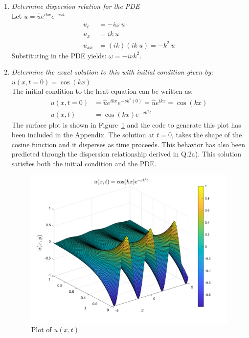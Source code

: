 \documentclass[11pt]{article}
\begin{document}
\begin{enumerate}
\begin{enumerate}[label=(\alph*)]
\item{\color{blue}\textit{Determine dispersion relation for the PDE}}\\
Let  $u  = \hat{u}e^{ikx}e^{-i\omega t} $\\
\begin{align*}
u_t & = -i\omega \ u \\
u_x & = ik\ u \\
u_{xx} & = (ik) (ik\ u) = -k^2 \ u 
\end{align*}
Substituting in the PDE yields: $ \omega = -i \nu k^2$. \\

\item{\color{blue} \textit{Determine the exact solution to this with initial condition given by:}} $u(x,t=0) = \cos(kx)$\\
The initial condition to the heat equation can be written as: 
\begin{align*}
u(x,t = 0) & = \hat{u}e^{ikx}e^{-\nu k^2 (0)} = \hat{u}e^{ikx} = \cos(kx) \\
u(x,t) & = \cos(kx)e^{-\nu k^2 t}
\end{align*}
The surface plot is shown in Figure~\ref{fig:q2b} and the code to generate this plot has been included in the Appendix. The solution at $t=0$, takes the shape of the cosine function and it disperses as time proceeds. This behavior has also been predicted through the dispersion relationship derived in Q.2a). This solution satisfies both the initial condition and the PDE. 
\begin{figure}[htp]
\begin{center}
\includegraphics[width=5in]{q2b}
\caption{Plot of $u(x,t)$}
\label{fig:q2b}
\end{center}
\end{figure}


\end{enumerate}
\end{enumerate}
\end{document}
